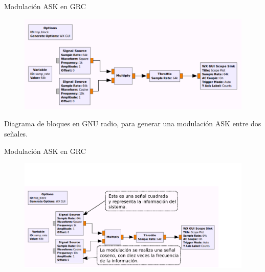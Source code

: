 \begin{frame}{Modulación ASK en GRC}

\begin{figure}[H]
\centering
\includegraphics[width=\textwidth]{parte1/lab4/pdf/lab4_1.pdf}
\end{figure}
Diagrama de bloques en GNU radio, para generar una modulación ASK entre dos señales.
\end{frame}

\begin{frame}{Modulación ASK en GRC}
\vspace{-1cm}
\begin{figure}[H]
\centering
\includegraphics[width=1.1\textwidth]{parte1/lab4/pdf/lab4_2.pdf}
\end{figure}
\end{frame}

